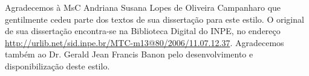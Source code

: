 
\begin{agradecimentos}  %

\hypertarget{estilo:agradecimentos}{} %
Agradecemos à MsC Andriana Susana Lopes de Oliveira Campanharo que gentilmente cedeu 
parte dos textos de sua dissertação para este estilo. O original de sua dissertação
encontra-se na Biblioteca Digital do INPE, no endereço \url {http://urlib.net/sid.inpe.br/MTC-m13@80/2006/11.07.12.37}.
Agradecemos também ao Dr. Gerald Jean Francis Banon pelo desenvolvimento e disponibilização deste estilo.
\end{agradecimentos}


